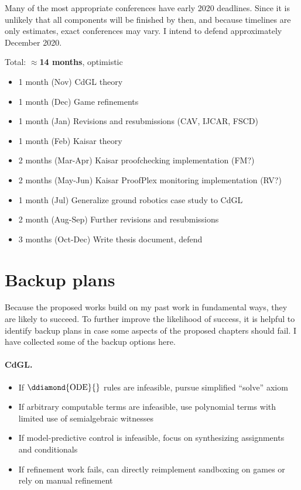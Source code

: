 \documentclass[12pt]{cmuthesis}
\theoremstyle{definition}
\theoremstyle{remark}
\newcommand{\CdGL}{\textsf{CdGL}\xspace}
\newcommand{\ProofPlex}{ProofPlex\xspace}
\begin{document}
Many of the most appropriate conferences have early 2020 deadlines.
Since it is unlikely that all components will be finished by then, and because timelines are only estimates, exact conferences may vary.
I intend to defend approximately December 2020.

Total: $\approx$\textbf{14 months}, optimistic
\begin{itemize}
\item 1 month (Nov) \CdGL theory
\item 1 month (Dec) Game refinements
\item 1 month (Jan) Revisions and resubmissions (CAV, IJCAR, FSCD)
\item 1 month (Feb) Kaisar theory
\item 2 months (Mar-Apr) Kaisar proofchecking implementation (FM?)
\item 2 months (May-Jun) Kaisar \ProofPlex monitoring implementation (RV?)
\item 1 month (Jul) Generalize ground robotics case study to \CdGL
\item 2 month (Aug-Sep) Further revisions and resubmissions
\item 3 months (Oct-Dec) Write thesis document, defend
\end{itemize}

\section{Backup plans}
Because the proposed works build on my past work in fundamental ways, they are likely to succeed.
To further improve the likelihood of success, it is helpful to identify backup plans in case some aspects of the proposed chapters should fail.
I have collected some of the backup options here.

\paragraph*{CdGL.}
\begin{itemize}
\item If $\ddiamond{\text{ODE}}{}$ rules are infeasible, pursue simplified ``solve'' axiom
\item If arbitrary computable terms are infeasible, use polynomial terms with limited use of semialgebraic witnesses
\item If model-predictive control is infeasible, focus on synthesizing assignments and conditionals
\item If refinement work fails, can directly reimplement sandboxing on games or rely on manual refinement
\end{itemize}
\end{document}

